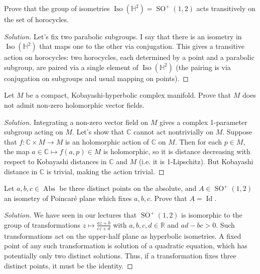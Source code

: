 \begin{manualexercise}{3.7}
	Prove that the group of isometries $\operatorname{Iso}(\mathbb{H}^{2})=\operatorname{SO}^{+}(1,2)$ acts transitively on the set of horocycles.
\end{manualexercise}

\begin{proof}[Solution]
	Let's fix two parabolic subgroups. I say that there is an isometry in $\operatorname{Iso}(\mathbb{H}^2)$ that maps one to the other via conjugation. This gives a transitive action on horocycles: two horocycles, each determined by a point and a parabolic subgroup, are paired via a single element of $\operatorname{Iso}(\mathbb{H}^2)$ (the pairing is via conjugation on subgroups and usual mapping on points).
\end{proof}

\begin{manualexercise}{4.2}
	Let $M$ be a compact, Kobayashi-hyperbolic complex manifold. Prove that $M$ does not admit non-zero holomorphic vector fields.
\end{manualexercise}

\begin{proof}[Solution]\leavevmode

Integrating a non-zero vector field on $M$ gives a complex 1-parameter subgroup acting on $M$. Let's show that $\mathbb{C}$ cannot act nontrivially on $M$. Suppose that $f:\mathbb{C}\times M\to M $ is an holomorphic action of $\mathbb{C}$ on $M$. Then for each $p\in M$, the map $a\in\mathbb{C}\mapsto f(a,p)\in M$ is holomorphic, so it is distance decreasing with respect to Kobayashi distances in $\mathbb{C}$ and $M$ (i.e. it is 1-Lipschitz). But Kobayashi distance in $\mathbb{C}$ is trivial, making the action trivial.
\end{proof}

\begin{manualexercise}{4.6}
	Let $a,b,c\in \operatorname{Abs}$ be three distinct points on the absolute, and $A\in \operatorname{SO}^{+}(1,2)$ an isometry of Poincar\'e plane which fixes $a,b,c$. Prove that $A=\operatorname{Id}$.
\end{manualexercise}

\begin{proof}[Solution]
	We have seen in our lectures that $\operatorname{SO}^{+}(1,2)$ is isomorphic to the group of transformations $z\mapsto \frac{az+b}{cz+d}$ with $a,b,c,d\in \mathbb{R}$ and $ad-bc>0$. Such transformations act on the upper-half plane as hyperbolic isometries.  A fixed point of any such transformation is solution of a quadratic equation, which has potentially only two distinct solutions. Thus, if a transformation fixes three distinct points, it must be the identity.
\end{proof}

